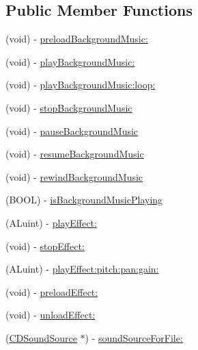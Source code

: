 \subsection*{Public Member Functions}
\begin{DoxyCompactItemize}
\item 
(void) -\/ \hyperlink{interface_simple_audio_engine_a289e2e89ab55d63a38792fd8f2e5b645}{preload\-Background\-Music\-:}
\item 
(void) -\/ \hyperlink{interface_simple_audio_engine_ae48157a1dea7e96833cb705bd6cd6709}{play\-Background\-Music\-:}
\item 
(void) -\/ \hyperlink{interface_simple_audio_engine_aec9fc4c618da2902f26615c087179508}{play\-Background\-Music\-:loop\-:}
\item 
(void) -\/ \hyperlink{interface_simple_audio_engine_a81e61f21116fc8d46b8242e9caa48006}{stop\-Background\-Music}
\item 
(void) -\/ \hyperlink{interface_simple_audio_engine_addf0536bfbb9ad38668108ee289ccaf6}{pause\-Background\-Music}
\item 
(void) -\/ \hyperlink{interface_simple_audio_engine_a565f2d3e28072b6a7173064b797767c0}{resume\-Background\-Music}
\item 
(void) -\/ \hyperlink{interface_simple_audio_engine_ab91dfde414f3ef20ccd891e59ba5a67d}{rewind\-Background\-Music}
\item 
(B\-O\-O\-L) -\/ \hyperlink{interface_simple_audio_engine_a973125b75501bf21ae82f30ab1aea87c}{is\-Background\-Music\-Playing}
\item 
(A\-Luint) -\/ \hyperlink{interface_simple_audio_engine_a520f061be6fdb4ea0d22cc258ea4f431}{play\-Effect\-:}
\item 
(void) -\/ \hyperlink{interface_simple_audio_engine_a4d818613fe0acb6fa8dc9fac400327f0}{stop\-Effect\-:}
\item 
(A\-Luint) -\/ \hyperlink{interface_simple_audio_engine_aed4a3e55cdbae87e3129c9ed54db1ced}{play\-Effect\-:pitch\-:pan\-:gain\-:}
\item 
(void) -\/ \hyperlink{interface_simple_audio_engine_a0f27d03cab04292f2dcbfc1ba8344e54}{preload\-Effect\-:}
\item 
(void) -\/ \hyperlink{interface_simple_audio_engine_a1f3f121b3664c6b5bcfc33c8af63e52c}{unload\-Effect\-:}
\item 
(\hyperlink{interface_c_d_sound_source}{C\-D\-Sound\-Source} $\ast$) -\/ \hyperlink{interface_simple_audio_engine_a8ab8450895ef35d23744db31e5826d01}{sound\-Source\-For\-File\-:}
\end{DoxyCompactItemize}
